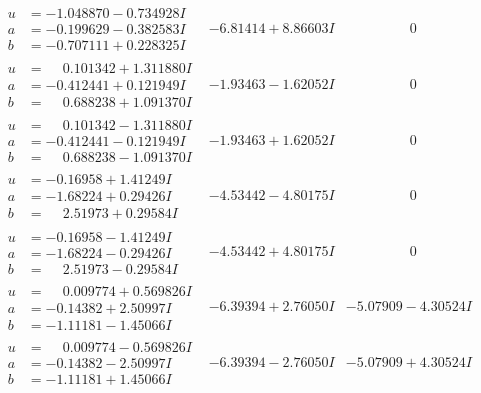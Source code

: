 \documentclass[1p]{elsarticle_modified}
\theoremstyle{definition}
\begin{document}
$$\begin{array}{c|c|c}
\begin{aligned}
u &= -1.048870 - 0.734928 I \\
a &= -0.199629 - 0.382583 I \\
b &= -0.707111 + 0.228325 I\end{aligned}
 & -6.81414 + 8.86603 I & \phantom{-0.000000 } 0 \\ \hline\begin{aligned}
u &= \phantom{-}0.101342 + 1.311880 I \\
a &= -0.412441 + 0.121949 I \\
b &= \phantom{-}0.688238 + 1.091370 I\end{aligned}
 & -1.93463 - 1.62052 I & \phantom{-0.000000 } 0 \\ \hline\begin{aligned}
u &= \phantom{-}0.101342 - 1.311880 I \\
a &= -0.412441 - 0.121949 I \\
b &= \phantom{-}0.688238 - 1.091370 I\end{aligned}
 & -1.93463 + 1.62052 I & \phantom{-0.000000 } 0 \\ \hline\begin{aligned}
u &= -0.16958 + 1.41249 I \\
a &= -1.68224 + 0.29426 I \\
b &= \phantom{-}2.51973 + 0.29584 I\end{aligned}
 & -4.53442 - 4.80175 I & \phantom{-0.000000 } 0 \\ \hline\begin{aligned}
u &= -0.16958 - 1.41249 I \\
a &= -1.68224 - 0.29426 I \\
b &= \phantom{-}2.51973 - 0.29584 I\end{aligned}
 & -4.53442 + 4.80175 I & \phantom{-0.000000 } 0 \\ \hline\begin{aligned}
u &= \phantom{-}0.009774 + 0.569826 I \\
a &= -0.14382 + 2.50997 I \\
b &= -1.11181 - 1.45066 I\end{aligned}
 & -6.39394 + 2.76050 I & -5.07909 - 4.30524 I \\ \hline\begin{aligned}
u &= \phantom{-}0.009774 - 0.569826 I \\
a &= -0.14382 - 2.50997 I \\
b &= -1.11181 + 1.45066 I\end{aligned}
 & -6.39394 - 2.76050 I & -5.07909 + 4.30524 I \\ \hline\begin{aligned}

\end{aligned}
\end{array}$$
\end{document}
